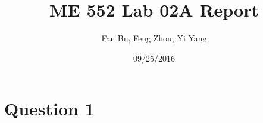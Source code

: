 \documentclass[letterpaper]{article}
\author{Fan Bu, Feng Zhou, Yi Yang}
\title{ME 552 Lab 02A Report}
\begin{document}
\date{09/25/2016}
\maketitle

\newcommand{\trace}{\mathrm{trace}}
\newcommand{\real}{\mathbb R}  %
\newcommand{\nat}{\mathbb N}   %
\newcommand{\cp}{\mathbb C}    %
\newcommand{\ds}{\displaystyle}
\newcommand{\mf}[2]{\frac{\ds #1}{\ds #2}}
\newcommand{\spanof}[1]{\textrm{span} \{ #1 \}}
\newcommand{\sol}[0]{\textbf{Solution: }}
\newcommand{\pf}[0]{\textbf{Proof:}}
\newcommand{\rme}[0]{\textrm{e}}
\newcommand{\Null}[1]{\textrm{Null}\{#1\}}
\parindent 0pt
\section*{Question 1}
\end{document}
